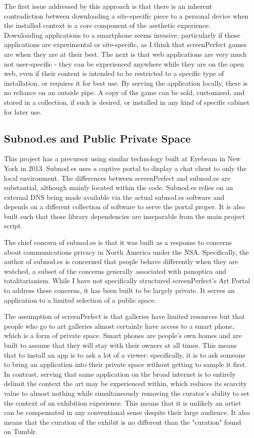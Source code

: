 The first issue addressed by this approach is that there is an inherent contradiction between downloading a site-specific piece to a personal device when the installed context is a core component of the aesthetic experience. Downloading applications to a smartphone seems invasive, particularly if those applications are experimental or site-specific, as I think that screenPerfect games are when they are at their best. The next is that web applications are very much not user-specific - they can be experienced anywhere while they are on the open web, even if their content is intended to be restricted to a specific type of installation, or requires it for best use. By serving the application locally, there is no reliance on an outside pipe. A copy of the game can be sold, customised, and stored in a collection, if such is desired, or installed in any kind of specific cabinet for later use.

\subsection{Subnod.es and Public Private Space}
This project has a precursor using similar technology built at Eyebeam in New York in 2013. Subnod.es uses a captive portal to display a chat client to only the local environment. The differences between screenPerfect and subnod.es are substantial, although mainly located within the code. Subnod.es relies on an external DNS being made available via the actual subnod.es software and depends on a different collection of software to serve the portal proper. It is also built such that those library dependencies are inseparable from the main project script.

The chief concern of subnod.es is that it was built as a response to concerns about communications privacy in North America under the NSA. Specifically, the author of subnod.es is concerned that people behave differently when they are watched, a subset of the concerns generally associated with panoptica and totalitarianism. While I have not specifically structured screenPerfect's Art Portal to address these concerns, it has been built to be largely private. It serves an application to a limited selection of a public space.

The assumption of screenPerfect is that galleries have limited resources but that people who go to art galleries almost certainly have access to a smart phone, which is a form of private space. Smart phones are people's own homes and are built to assume that they will stay with their owners at all times. This means that to install an app is to ask a lot of a viewer: specifically, it is to ask someone to bring an application into their private space without getting to sample it first. In contrast, serving that same application on the broad internet is to entirely delimit the context the art may be experienced within, which reduces its scarcity value to almost nothing while simultaneously removing the curator's ability to set the context of an exhibition experience. This means that it is unlikely an artist can be compensated in any conventional sense despite their large audience. It also means that the curation of the exhibit is no different than the "curation" found on Tumblr.

